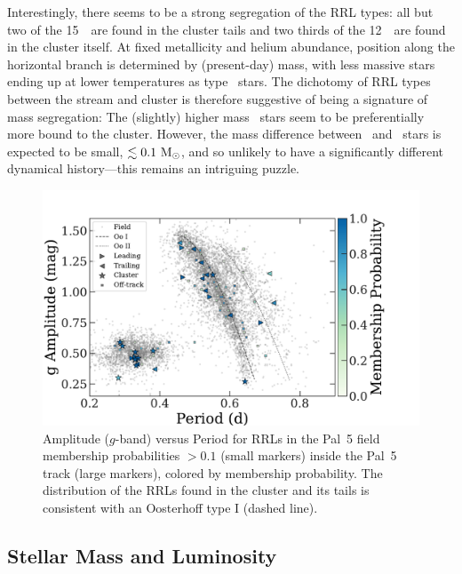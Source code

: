 \documentclass[twocolumn]{aastex63}
\newcommand{\NRRab}{15}    %
\newcommand{\NRRc}{12}     %
\begin{document}
Interestingly, there seems to be a strong segregation of the RRL types: all but two of the \NRRab\ \rrab~are found in the cluster tails and two thirds of the \NRRc\ \rrc~are found in the cluster itself. At fixed metallicity and helium abundance, position along the horizontal branch is determined by (present-day) mass, with less massive stars ending up at lower temperatures as type \typeab~stars.
The dichotomy of RRL types between the stream and cluster is therefore suggestive of being a signature of mass segregation: The (slightly) higher mass \rrc\ stars seem to be preferentially more bound to the cluster.
However, the mass difference between \rrab\ and \rrc\ stars is expected to be small, $\lesssim 0.1~\mathrm{M}_\odot$, and so unlikely to have a significantly different dynamical history---this remains an intriguing puzzle.

\begin{figure}[t]
\begin{center}
\includegraphics[width=\textwidth]{rrls_PA.pdf}
\caption{Amplitude ($g$-band) versus Period for RRLs in the Pal~5 field membership probabilities $>0.1$ (small markers) inside the Pal~5 track (large markers), colored by membership probability. The distribution of the RRLs found in the cluster and its tails is consistent with an Oosterhoff type I (dashed line). }
\label{fig:PA_diagram}
\end{center}
\end{figure}

\subsection{Stellar Mass and Luminosity}
\end{document}
